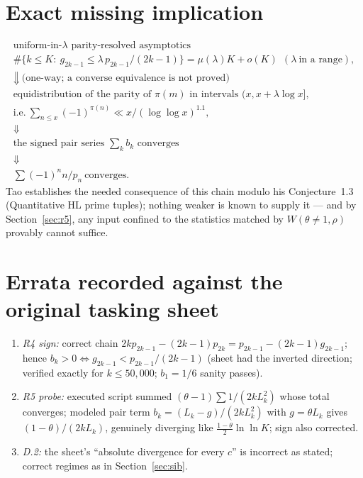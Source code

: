 \documentclass[11pt]{article}
\theoremstyle{definition}
\begin{document}
\section{Exact missing implication}\label{sec:chain}

\[
\boxed{
\begin{gathered}
\text{uniform-in-}\lambda\text{ parity-resolved asymptotics}\\
\#\{k\le K:\ g_{2k-1}\le\lambda\, p_{2k-1}/(2k-1)\}=\mu(\lambda)K+o(K)\ \ (\lambda\ \text{in a range}),\\
\Downarrow\ \text{(one-way; a converse equivalence is not proved)}\\
\text{equidistribution of the parity of }\pi(m)\text{ in intervals }(x,x+\lambda\log x],\\
\text{i.e.}\ \sum_{n\le x}(-1)^{\pi(n)}\ll x/(\log\log x)^{1.1},\\
\Downarrow\\
\text{the signed pair series }\sum_kb_k\text{ converges}\\
\Downarrow\\
\textstyle\sum(-1)^n n/p_n\ \text{converges.}
\end{gathered}}
\]
Tao \cite{Ta23} establishes the needed consequence of this chain modulo his Conjecture~1.3 (Quantitative HL prime tuples); nothing weaker is known to supply it --- and by Section~\ref{sec:r5}, any input confined to the statistics matched by $W(\theta\ne1,\rho)$ provably cannot suffice.

\section*{Errata recorded against the original tasking sheet}
\begin{enumerate}\itemsep2pt
\item \emph{R4 sign:} correct chain $2kp_{2k-1}-(2k-1)p_{2k}=p_{2k-1}-(2k-1)g_{2k-1}$; hence $b_k>0\iff g_{2k-1}<p_{2k-1}/(2k-1)$ (sheet had the inverted direction; verified exactly for $k\le50{,}000$; $b_1=1/6$ sanity passes).
\item \emph{R5 probe:} executed script summed $(\theta-1)\sum1/(2kL_k^2)$ whose total converges; modeled pair term $b_k=(L_k-g)/(2kL_k^2)$ with $g=\theta L_k$ gives $(1-\theta)/(2kL_k)$, genuinely diverging like $\frac{1-\theta}{2}\ln\ln K$; sign also corrected.
\item \emph{D.2:} the sheet's ``absolute divergence for every $c$'' is incorrect as stated; correct regimes as in Section~\ref{sec:sib}.
\end{enumerate}
\end{document}
